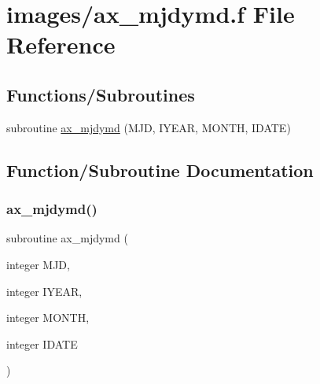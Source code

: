 \hypertarget{ax__mjdymd_8f}{}\section{images/ax\+\_\+mjdymd.f File Reference}
\label{ax__mjdymd_8f}
\subsection*{Functions/\+Subroutines}
\begin{DoxyCompactItemize}
\item 
subroutine \hyperlink{ax__mjdymd_8f_acd70ad1516e04a3488ab289daea9239b}{ax\+\_\+mjdymd} (M\+JD, I\+Y\+E\+AR, M\+O\+N\+TH, I\+D\+A\+TE)
\end{DoxyCompactItemize}


\subsection{Function/\+Subroutine Documentation}
\mbox{\label{ax__mjdymd_8f_acd70ad1516e04a3488ab289daea9239b}} 
\subsubsection{\texorpdfstring{ax\+\_\+mjdymd()}{ax\_mjdymd()}}
{\footnotesize\ttfamily subroutine ax\+\_\+mjdymd (\begin{DoxyParamCaption}\item[{integer}]{M\+JD,  }\item[{integer}]{I\+Y\+E\+AR,  }\item[{integer}]{M\+O\+N\+TH,  }\item[{integer}]{I\+D\+A\+TE }\end{DoxyParamCaption})}


